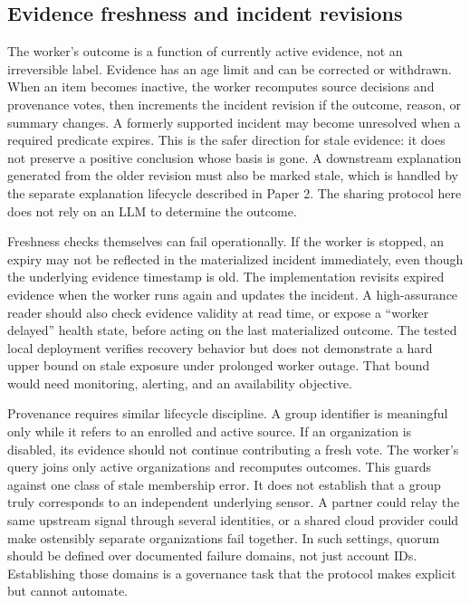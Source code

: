 \documentclass[conference,letterpaper]{IEEEtran}
\begin{document}
\subsection{Evidence freshness and incident revisions}
The worker's outcome is a function of currently active evidence, not an irreversible label. Evidence has an age limit and can be corrected or withdrawn. When an item becomes inactive, the worker recomputes source decisions and provenance votes, then increments the incident revision if the outcome, reason, or summary changes. A formerly supported incident may become unresolved when a required predicate expires. This is the safer direction for stale evidence: it does not preserve a positive conclusion whose basis is gone. A downstream explanation generated from the older revision must also be marked stale, which is handled by the separate explanation lifecycle described in Paper 2. The sharing protocol here does not rely on an LLM to determine the outcome.

Freshness checks themselves can fail operationally. If the worker is stopped, an expiry may not be reflected in the materialized incident immediately, even though the underlying evidence timestamp is old. The implementation revisits expired evidence when the worker runs again and updates the incident. A high-assurance reader should also check evidence validity at read time, or expose a ``worker delayed'' health state, before acting on the last materialized outcome. The tested local deployment verifies recovery behavior but does not demonstrate a hard upper bound on stale exposure under prolonged worker outage. That bound would need monitoring, alerting, and an availability objective.

Provenance requires similar lifecycle discipline. A group identifier is meaningful only while it refers to an enrolled and active source. If an organization is disabled, its evidence should not continue contributing a fresh vote. The worker's query joins only active organizations and recomputes outcomes. This guards against one class of stale membership error. It does not establish that a group truly corresponds to an independent underlying sensor. A partner could relay the same upstream signal through several identities, or a shared cloud provider could make ostensibly separate organizations fail together. In such settings, quorum should be defined over documented failure domains, not just account IDs. Establishing those domains is a governance task that the protocol makes explicit but cannot automate.
\end{document}

